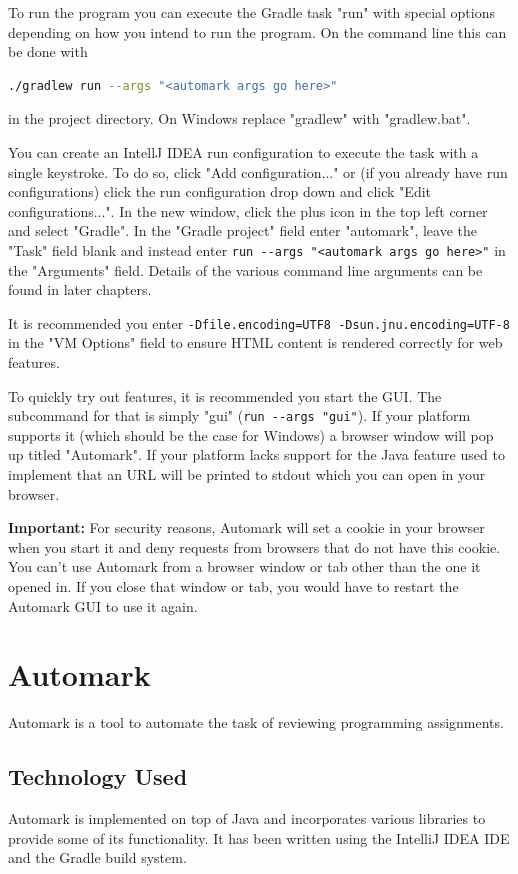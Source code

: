 \documentclass[12pt,a4paper,oneside]{report}
\begin{document}
	\pagebreak
	To run the program you can execute the Gradle task "run" with special options depending on how you intend to run the program. On the command line this can be done with
	\begin{lstlisting}[language=sh]
		./gradlew run --args "<automark args go here>"
	\end{lstlisting}
	in the project directory. On Windows replace "gradlew" with "gradlew.bat".

	You can create an IntellJ IDEA run configuration to execute the task with a single keystroke. To do so, click "Add configuration..." or (if you already have run configurations) click the run configuration drop down and click "Edit configurations...". In the new window, click the plus icon in the top left corner and select "Gradle". In the "Gradle project" field enter "automark", leave the "Task" field blank and instead enter \lstinline|run --args "<automark args go here>"| in the "Arguments" field. Details of the various command line arguments can be found in later chapters. %

	It is recommended you enter \lstinline|-Dfile.encoding=UTF8 -Dsun.jnu.encoding=UTF-8| in the "VM Options" field to ensure HTML content is rendered correctly for web features.

	To quickly try out features, it is recommended you start the GUI. The subcommand for that is simply "gui" (\lstinline|run --args "gui"|). If your platform supports it (which should be the case for Windows) a browser window will pop up titled "Automark". If your platform lacks support for the Java feature used to implement that an URL will be printed to stdout which you can open in your browser.

	\textbf{Important:} For security reasons, Automark will set a cookie in your browser when you start it and deny requests from browsers that do not have this cookie. You can't use Automark from a browser window or tab other than the one it opened in. If you close that window or tab, you would have to restart the Automark GUI to use it again.

	\fi

	\chapter{Automark}
	Automark is a tool to automate the task of reviewing programming assignments.

	\section{Technology Used}
	Automark is implemented on top of Java and incorporates various libraries to provide some of its functionality. It has been written using the IntelliJ IDEA IDE and the Gradle build system.
\end{document}
